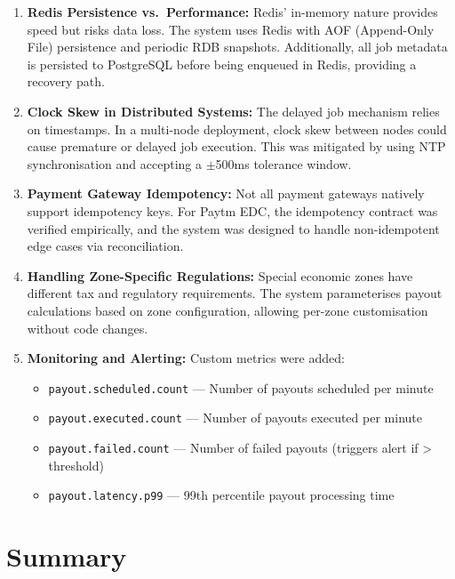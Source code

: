\documentclass[12pt,a4paper,oneside]{report}
\begin{document}
\begin{enumerate}
    \item \textbf{Redis Persistence vs.\ Performance:} Redis' in-memory nature provides speed but risks data loss. The system uses Redis with AOF (Append-Only File) persistence and periodic RDB snapshots. Additionally, all job metadata is persisted to PostgreSQL before being enqueued in Redis, providing a recovery path.

    \item \textbf{Clock Skew in Distributed Systems:} The delayed job mechanism relies on timestamps. In a multi-node deployment, clock skew between nodes could cause premature or delayed job execution. This was mitigated by using NTP synchronisation and accepting a $\pm$500ms tolerance window.

    \item \textbf{Payment Gateway Idempotency:} Not all payment gateways natively support idempotency keys. For Paytm EDC, the idempotency contract was verified empirically, and the system was designed to handle non-idempotent edge cases via reconciliation.

    \item \textbf{Handling Zone-Specific Regulations:} Special economic zones have different tax and regulatory requirements. The system parameterises payout calculations based on zone configuration, allowing per-zone customisation without code changes.

    \item \textbf{Monitoring and Alerting:} Custom metrics were added:
    \begin{itemize}
        \item \texttt{payout.scheduled.count} — Number of payouts scheduled per minute
        \item \texttt{payout.executed.count} — Number of payouts executed per minute
        \item \texttt{payout.failed.count} — Number of failed payouts (triggers alert if > threshold)
        \item \texttt{payout.latency.p99} — 99th percentile payout processing time
    \end{itemize}
\end{enumerate}

\section{Summary}
\end{document}
